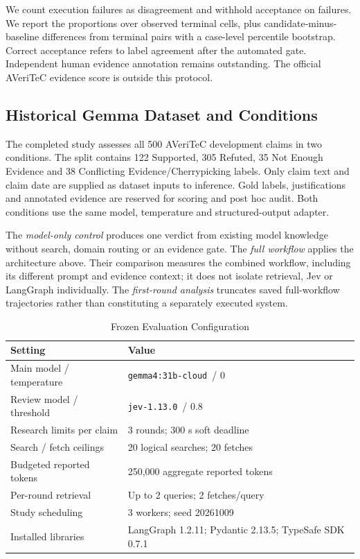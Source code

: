 \documentclass[conference]{IEEEtran}
\newcommand{\modelname}{\texttt{gemma4:31b-cloud}}
\newcommand{\jevname}{\texttt{jev-1.13.0}}
\begin{document}
We count execution failures as disagreement and withhold acceptance on failures. We report the proportions over observed terminal cells, plus candidate-minus-baseline differences from terminal pairs with a case-level percentile bootstrap. Correct acceptance refers to label agreement after the automated gate. Independent human evidence annotation remains outstanding. The official AVeriTeC evidence score is outside this protocol.

\subsection{Historical Gemma Dataset and Conditions}
The completed study assesses all 500 AVeriTeC development claims in two conditions. The split contains 122 Supported, 305 Refuted, 35 Not Enough Evidence and 38 Conflicting Evidence/Cherrypicking labels. Only claim text and claim date are supplied as dataset inputs to inference. Gold labels, justifications and annotated evidence are reserved for scoring and post hoc audit. Both conditions use the same model, temperature and structured-output adapter.

The \emph{model-only control} produces one verdict from existing model knowledge without search, domain routing or an evidence gate. The \emph{full workflow} applies the architecture above. Their comparison measures the combined workflow, including its different prompt and evidence context; it does not isolate retrieval, Jev or LangGraph individually. The \emph{first-round analysis} truncates saved full-workflow trajectories rather than constituting a separately executed system.

\begin{table}[t]
\caption{Frozen Evaluation Configuration}
\label{tab:protocol}
\centering
\footnotesize
\begin{tabular}{@{}p{}p{}@{}}
\toprule
Setting & Value\\
\midrule
Main model / temperature & \modelname\ / 0\\
Review model / threshold & \jevname\ / 0.8\\
Research limits per claim & 3 rounds; 300 s soft deadline\\
Search / fetch ceilings & 20 logical searches; 20 fetches\\
Budgeted reported tokens & 250,000 aggregate reported tokens\\
Per-round retrieval & Up to 2 queries; 2 fetches/query\\
Study scheduling & 3 workers; seed 20261009\\
Installed libraries & LangGraph 1.2.11; Pydantic 2.13.5; TypeSafe SDK 0.7.1\\
\bottomrule
\end{tabular}
\end{table}
\end{document}
